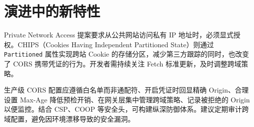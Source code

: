 \chapter{演进中的新特性}
Private Network Access 提案要求从公共网站访问私有 IP 地址时，必须显式授权。CHIPS（Cookies Having Independent Partitioned State）则通过 \texttt{Partitioned} 属性实现跨站 Cookie 的存储分区，减少第三方跟踪的同时，也改变了 CORS 携带凭证的行为。开发者需持续关注 Fetch 标准更新，及时调整跨域策略。\par
生产级 CORS 配置应遵循白名单而非通配符、开启凭证时回显精确 Origin、合理设置 Max-Age 降低预检开销、在网关层集中管理跨域策略、记录被拒绝的 Origin 以便监控。结合 CSP、COOP 等安全头，可构建纵深防御体系。建议定期审计跨域配置，避免因环境漂移导致的安全漏洞。\par
